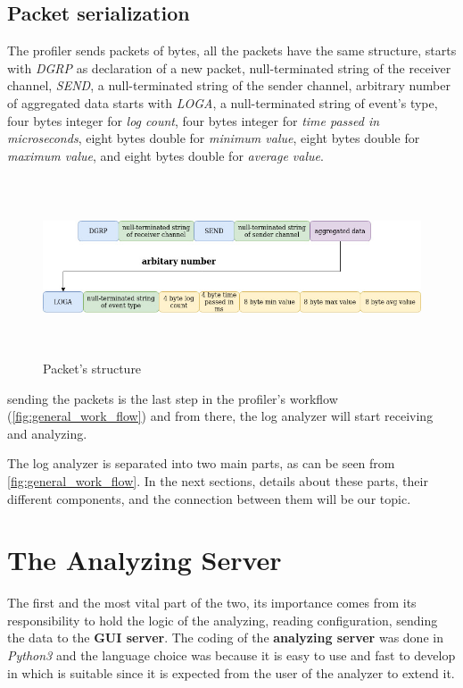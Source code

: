 \subsection{Packet serialization}\label{sec:packet_serialization}
The profiler sends packets of bytes, all the packets have the same structure, starts with \textit{DGRP}
as declaration of a new packet, null-terminated string of the receiver channel, 
\textit{SEND}, a null-terminated string of the sender channel, arbitrary number of aggregated data starts
with \textit{LOGA}, a null-terminated string of event's type, four bytes integer for \textit{log count}, 
four bytes integer for \textit{time passed in microseconds}, eight bytes double for \textit{minimum value}, 
eight bytes double for \textit{maximum value}, and eight bytes double for \textit{average value}.
\newline
\begin{figure}[H]
	\centering
	\includegraphics[width=1.0\textwidth,height=200px]{images/packet.jpg}
	\caption{Packet's structure}
	\label{fig:packet_structure}
\end{figure}

sending the packets is the last step in the profiler's workflow (\ref{fig:general_work_flow}) 
and from there, the log analyzer will start receiving and analyzing.

The log analyzer is separated into two main parts, as can be seen from \ref{fig:general_work_flow}.
In the next sections, details about these parts, their different components, and the connection between
them will be our topic.

\section{The Analyzing Server}
The first and the most vital part of the two, its importance comes from its responsibility
to hold the logic of the analyzing, reading configuration, sending the data to the \textbf{GUI server}.
The coding of the \textbf{analyzing server} was done in \textit{Python3} and the language choice was because
it is easy to use and fast to develop in which is suitable since it is expected from the user of the
analyzer to extend it.


